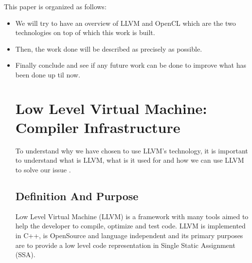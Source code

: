 \documentclass{article}
\begin{document}
This paper is organized as follows: 
\begin{itemize}
\item We will try to have an overview of LLVM and OpenCL which are the two technologies on top of which this work is built.
\item Then, the work done will be described as precisely as possible.
\item Finally conclude and see if any future work can be done to improve what has been done up til now.



\section{Low Level Virtual Machine: Compiler Infrastructure}

To understand why we have chosen to use LLVM's technology, it is important to understand what is LLVM, what is it used for and how we can use LLVM to solve our issue \cite{lattner2004llvm}.

\subsection{Definition And Purpose}
\par
Low Level Virtual Machine (LLVM) is a framework with many tools aimed to help the developer to compile, optimize and test code. LLVM is implemented in C++, is OpenSource and language independent and its primary purposes are to provide a low level code representation in Single Static Assignment (SSA). \cite{leestatic}\\

\begin{comment}
\paragraph{}
LLVM contains three primary components \\
\begin{itemize}
\item LLVM Virtual Instruction Set: This framework offers us the possibility to have a new way to represent code which will presented in the next sections. 
\item Collection of libraries: LLVM offers well-integrated libraries that give the possibility to proceed to code analysis, optimizations and generations.
\item Collection of tools: To generate bytecode, machine code, LLVM provided also different tools to perform such things, such as opt or llc \cite{LattnerAdve:tutorial} .
\end{itemize} 
\end{comment}


\end{itemize}
\end{document}
